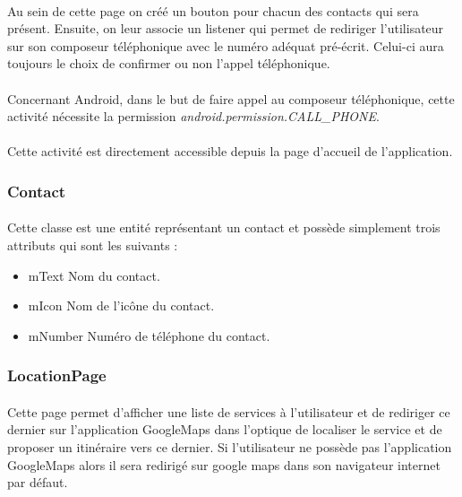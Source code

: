 	\paragraph{}
		Au sein de cette page on créé un bouton pour chacun des contacts qui sera présent. Ensuite, on leur associe un listener qui permet de rediriger l'utilisateur sur son composeur téléphonique avec le numéro adéquat pré-écrit. Celui-ci aura toujours le choix de confirmer ou non l'appel téléphonique.
	
	\paragraph{}
		Concernant Android, dans le but de faire appel au composeur téléphonique, cette activité nécessite la permission \emph{android.permission.CALL\_PHONE}. 
	
	\paragraph{}
		Cette activité est directement accessible depuis la page d'accueil de l'application.
	\subsubsection{Contact}
		\paragraph{}
			Cette classe est une entité représentant un contact et possède simplement trois attributs qui sont les suivants :
			\begin{itemize}
				\item mText Nom du contact.
				\item mIcon Nom de l'icône du contact.
				\item mNumber Numéro de téléphone du contact.
			\end{itemize}
	\subsubsection{LocationPage}
	\paragraph{}
		Cette page permet d'afficher une liste de services à l'utilisateur et de rediriger ce dernier sur l'application GoogleMaps dans l'optique de localiser le service et de proposer un itinéraire vers ce dernier. Si l'utilisateur ne possède pas l'application GoogleMaps alors il sera redirigé sur google maps dans son navigateur internet par défaut.
	

